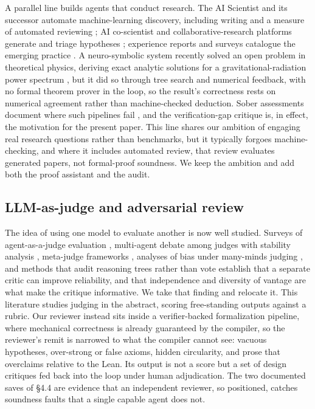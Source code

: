 \documentclass[11pt]{article}
\begin{document}
A parallel line builds agents that conduct research. The AI Scientist and its successor automate
machine-learning discovery, including writing and a measure of automated reviewing \cite{r1,r2};
AI co-scientist and collaborative-research platforms generate and triage hypotheses \cite{r3};
experience reports and surveys catalogue the emerging practice \cite{r17,r18}. A neuro-symbolic
system recently solved an open problem in theoretical physics, deriving exact analytic solutions for
a gravitational-radiation power spectrum \cite{r4}, but it did so through tree search and numerical
feedback, with no formal theorem prover in the loop, so the result's correctness rests on numerical
agreement rather than machine-checked deduction. Sober assessments document where such pipelines
fail \cite{r7}, and the verification-gap critique \cite{r6} is, in effect, the motivation for the
present paper. This line shares our ambition of engaging real research questions rather than
benchmarks, but it typically forgoes machine-checking, and where it includes automated review, that
review evaluates generated papers, not formal-proof soundness. We keep the ambition and add both the
proof assistant and the audit.

\subsection{LLM-as-judge and adversarial review}

The idea of using one model to evaluate another is now well studied. Surveys of agent-as-a-judge
evaluation \cite{r19}, multi-agent debate among judges with stability analysis \cite{r20},
meta-judge frameworks \cite{r21}, analyses of bias under many-minds judging \cite{r22}, and methods
that audit reasoning trees rather than vote \cite{r23} establish that a separate critic can improve
reliability, and that independence and diversity of vantage are what make the critique informative.
We take that finding and relocate it. This literature studies judging in the abstract, scoring
free-standing outputs against a rubric. Our reviewer instead sits inside a verifier-backed
formalization pipeline, where mechanical correctness is already guaranteed by the compiler, so the
reviewer's remit is narrowed to what the compiler cannot see: vacuous hypotheses, over-strong or
false axioms, hidden circularity, and prose that overclaims relative to the Lean. Its output is not
a score but a set of design critiques fed back into the loop under human adjudication. The two
documented saves of \S4.4 are evidence that an independent reviewer, so positioned, catches
soundness faults that a single capable agent does not.
\end{document}
